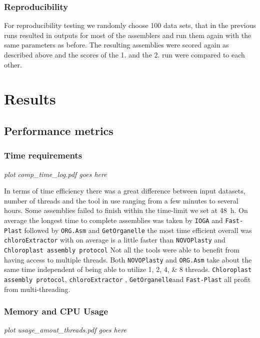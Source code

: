 \documentclass{bmcart}
\newcommand{\formatprogramnames}[1]{\texttt{#1}}
\newcommand{\ce}{\formatprogramnames{chloroExtractor}}
\newcommand{\oa}{\formatprogramnames{ORG.Asm}}
\newcommand{\fp}{\formatprogramnames{Fast-Plast}}
\newcommand{\ioga}{\formatprogramnames{IOGA}}
\newcommand{\np}{\formatprogramnames{NOVOPlasty}}
\newcommand{\go}{\formatprogramnames{GetOrganelle}}
\newcommand{\cassp}{\formatprogramnames{Chloroplast assembly protocol}}
\begin{document}
\subsubsection*{Reproducibility}
For reproducibility  testing we randomly choose  \num{100} data sets, that in the previous runs resulted in outputs for most of the assemblers and run them again with the same parameters as before. The resulting assemblies were scored again as described above and the scores of the 1. and the 2. run were compared to each other. 

\section*{Results}
\subsection*{Performance metrics}

\subsubsection*{Time requirements}

\textit{plot comp\_time\_log.pdf goes here}

In terms of time efficiency there was a great difference between input datasets, number of threads and the tool in use ranging from a few minutes to several hours. Some assemblies failed to finish within the time-limit we set at \SI{48}{\hour}. 
On average the longest time to complete assemblies was taken by \ioga{} and \fp{} followed by \oa{} and \go{} the most time efficient overall was \ce{} with on average is a little faster than \np{} and \cassp{}
Not all the tools were able to benefit from having access to multiple threads. Both \np{} and \oa{} take about the same time independent of being able to utilize \numlist[list-final-separator={, or }]{1;2;4;8} threads. \cassp{}, \ce{} , \go and \fp{} all profit from multi-threading.

\subsubsection*{Memory and CPU Usage }
\textit{plot usage\_amout\_threads.pdf goes here}
\end{document}
